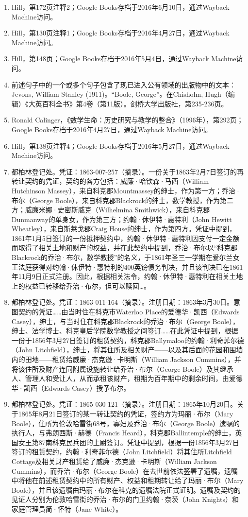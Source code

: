 \begin{enumerate}
\item Hill，第172页注释2；Google Books存档于2016年6月10日，通过Wayback Machine访问。  
\item Hill，第130页注释1；Google Books存档于2016年4月27日，通过Wayback Machine访问。  
\item Hill，第148页；Google Books存档于2016年5月4日，通过Wayback Machine访问。  
\item 前述句子中的一个或多个句子包含了现已进入公有领域的出版物中的文本：Jevons, William Stanley (1911)。“Boole, George”。在Chisholm, Hugh（编辑）《大英百科全书》第4卷（第11版）。剑桥大学出版社，第235-236页。
\item Ronald Calinger，《数学生命：历史研究与教学的整合》（1996年），第292页；Google Books存档于2016年4月27日，通过Wayback Machine访问。  
\item Hill，第138页注释4；Google Books存档于2016年5月27日，通过Wayback Machine访问。  
\item 都柏林登记处。凭证：1863-007-257（摘录）。一份关于1863年2月7日签订的再转让契约的凭证，契约的各方包括：威廉·哈钦森·马西（William Hutchinson Massey），来自科克郡Mountmassey的绅士，作为第一方；乔治·布尔（George Boole），来自科克郡Blackrock的绅士，数学教授，作为第二方；威廉米娜·史密斯威克（Wilhelmina Smithwick），来自科克郡Dunmanway的单身女，作为第三方；约翰·休伊特·惠特利（John Hewitt Wheatley），来自斯莱戈郡Craig House的绅士，作为第四方。凭证中提到，1861年1月5日签订的一份抵押契约中，约翰·休伊特·惠特利因支付一定金额而取得了相关土地和财产的权益，并在此契约中提到，乔治·布尔以“科克郡Blackrock的乔治·布尔，数学教授”的名义，于1861年圣三一学期在爱尔兰女王法庭获得对约翰·休伊特·惠特利的400英镑债务判决，并且该判决已在1861年11月9日正式注册。因此，根据相关法令，约翰·休伊特·惠特利在相关土地上的权益已转移给乔治·布尔，但可以赎回…。
\item 都柏林登记处。凭证：1863-011-164（摘录）。注册日期：1863年3月30日。意图契约的凭证……由当时住在科克市Waterloo Place的爱德华·凯西（Edwards Casey），绅士，与当时住在科克郡Blackrock的乔治·布尔（George Boole），绅士、法学博士、科克皇后学院数学教授之间签订……在此凭证中提到，根据一份于1856年3月27日签订的租赁契约，科克郡Ballymaloo的约翰·利奇菲尔德（John Litchfield），绅士，将其住所及相关财产——以及其后面的花园和围墙内的田地——租赁给威廉·杰克逊·卡明斯（William Jackson Cummins），并将该住所及财产连同附属设施转让给乔治·布尔（George Boole）及其继承人、管理人和受让人，从而承租该财产，租期为百年期中的剩余时间，由爱德华·凯西（Edwards Casey）授予布尔。
\item 都柏林登记处。凭证：1865-030-121（摘录）。注册日期：1865年10月20日。关于1865年8月21日签订的某一转让契约的凭证，签约方为玛丽·布尔（Mary Boole），住所为伦敦哈雷街68号，寡妇及乔治·布尔（George Boole）遗嘱的执行人，与弗朗西斯·赫德（Francis Heard），科克郡Ballintemple的绅士，英国女王第87南科克民兵团的上尉签订。凭证中提到，根据一份1856年3月27日签订的租赁契约，约翰·利奇菲尔德（John Litchfield）将其住所Litchfield Cottage及相关财产租赁给了威廉·杰克逊·卡明斯（William Jackson Cummins），而乔治·布尔（George Boole）在去世前依法签署了遗嘱，遗嘱中将他在前述租赁契约中的所有财产、权益和租期转让给了玛丽·布尔（Mary Boole），并且该遗嘱由玛丽·布尔在科克的遗嘱法院正式证明。遗嘱及契约的见证人分别为伦敦哈雷街的乔治·布尔的门卫约翰·奈茨（John Knights）和家庭管理员简·怀特（Jane White）。

\end{enumerate}
